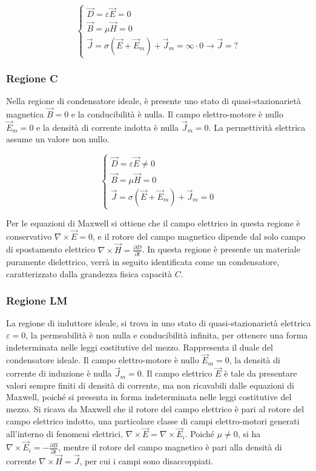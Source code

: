 \documentclass{article}
\numberwithin{equation}{subsection}
\begin{document}
\begin{equation*}
    \begin{cases}
        \vec{D}=\varepsilon\vec{E}=0\\
        \vec{B}=\mu\vec{H}=0\\
        \vec{J}=\sigma(\vec{E}+\vec{E}_m)+\vec{J}_m=\infty\cdot0\to\vec{J}=?
    \end{cases}
\end{equation*}

\subsubsection{Regione C}

Nella regione di condensatore ideale, è presente uno stato di quasi-stazionarietà magnetica $\vec{B}=0$ e la conducibilità è nulla. Il campo elettro-motore è nullo $\vec{E}_m=0$ 
e la densità di corrente indotta è nulla $\vec{J}_m=0$. La permettività elettrica assume un valore non nullo. 

\begin{equation*}
    \begin{cases}
        \vec{D}=\varepsilon\vec{E}\neq0\\
        \vec{B}=\mu\vec{H}=0\\
        \vec{J}=\sigma(\vec{E}+\vec{E}_m)+\vec{J}_m=0
    \end{cases}
\end{equation*}

Per le equazioni di Maxwell si ottiene che il campo elettrico in questa regione è conservativo $\nabla\times\vec{E}=0$, e il rotore del campo magnetico dipende dal solo campo 
di spostamento elettrico $\nabla\times\vec{H}=\displaystyle\frac{\partial D}{\partial t}$. In questa regione è presente un materiale puramente dielettrico, verrà in seguito 
identificata come un condensatore, caratterizzato dalla grandezza fisica capacità $C$.

\subsubsection{Regione LM}

La regione di induttore ideale, si trova in uno stato di quasi-stazionarietà elettrica $\varepsilon=0$, la permeabilità è non nulla e conducibilità infinita, per 
ottenere una forma indeterminata nelle leggi costitutive del mezzo. Rappresenta 
il duale del condensatore ideale. Il campo elettro-motore è nullo $\vec{E}_m=0$, la densità di corrente di induzione è nulla $\vec{J}_m=0$. Il campo elettrico $\vec{E}$ è tale 
da presentare valori sempre finiti di densità di corrente, ma non ricavabili dalle equazioni di Maxwell, poiché si presenta in forma indeterminata nelle leggi costitutive del mezzo. 
Si ricava da Maxwell che il rotore del campo elettrico è pari al rotore del campo elettrico indotto, una particolare classe di campi elettro-motori generati all'interno di 
fenomeni elettrici, $\nabla\times\vec{E}=\nabla\times\vec{E}_i$. 
Poiché $\mu\neq0$, si ha $\nabla\times\vec{E}_i=\displaystyle-\frac{\partial B}{\partial t}$, mentre il rotore del campo magnetico è pari alla densità di corrente 
$\nabla\times\vec{H}=\vec{J}$, per cui i campi sono disaccoppiati. 
\end{document}
